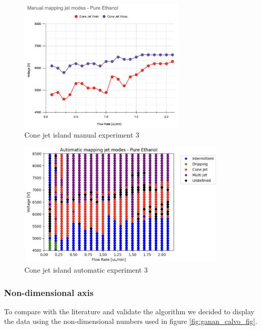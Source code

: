     \begin{multicols}{2}


        \begin{figure}[H]
            \center
            \includegraphics[width=8cm]{Figuras/april/map5.png}
            \caption{Cone jet island manual experiment 3}
            \label{fig:stability_6}
        \end{figure}

        \begin{figure}[H]
            \center
            \includegraphics[width=10cm]{Figuras/april/map2.png}
            \caption{Cone jet island automatic experiment 3}
            \label{fig:stability_7}
        \end{figure}


    \end{multicols}

    \subsubsection{Non-dimensional axis}

    To compare with the literature and validate the algorithm we decided to display the data using the non-dimensional numbers used in figure \ref{fig:ganan_calvo_fig}.

